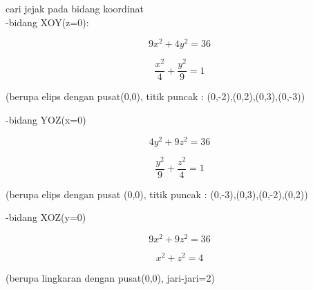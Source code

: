 \documentclass[12pt,arial,letterpaper]{book}
\begin{document}
\begin{eulercomment}
\begin{eulercomment}
\begin{eulercomment}
\begin{eulercomment}
\begin{eulercomment}
\begin{eulercomment}
\begin{eulercomment}
\begin{eulercomment}
\begin{eulercomment}
\begin{eulercomment}
\begin{eulercomment}
\begin{eulercomment}
\begin{eulercomment}
\begin{eulercomment}
\begin{eulercomment}
\begin{eulercomment}
\begin{eulercomment}
\begin{eulercomment}
\begin{eulercomment}
cari jejak pada bidang koordinat\\
-bidang XOY(z=0):\\
\end{eulercomment}
\begin{eulerformula}
\[
9x^2+4y^2=36
\]
\end{eulerformula}
\begin{eulerformula}
\[
\frac{x^2}{4}+\frac{y^2}{9}=1
\]
\end{eulerformula}
\begin{eulercomment}
(berupa elips dengan pusat(0,0), titik puncak :
(0,-2),(0,2),(0,3),(0,-3))

-bidang YOZ(x=0)\\
\end{eulercomment}
\begin{eulerformula}
\[
4y^2+9z^2=36
\]
\end{eulerformula}
\begin{eulerformula}
\[
\frac{y^2}{9}+\frac{z^2}{4}=1
\]
\end{eulerformula}
\begin{eulercomment}
(berupa elips dengan pusat (0,0), titik puncak :
(0,-3),(0,3),(0,-2),(0,2))

-bidang XOZ(y=0)\\
\end{eulercomment}
\begin{eulerformula}
\[
9x^2+9z^2=36
\]
\end{eulerformula}
\begin{eulerformula}
\[
x^2+z^2=4
\]
\end{eulerformula}
\begin{eulercomment}
(berupa lingkaran dengan pusat(0,0), jari-jari=2)


\end{eulercomment}
\end{eulercomment}
\end{eulercomment}
\end{eulercomment}
\end{eulercomment}
\end{eulercomment}
\end{eulercomment}
\end{eulercomment}
\end{eulercomment}
\end{eulercomment}
\end{eulercomment}
\end{eulercomment}
\end{eulercomment}
\end{eulercomment}
\end{eulercomment}
\end{eulercomment}
\end{eulercomment}
\end{eulercomment}
\end{eulercomment}
\end{document}
